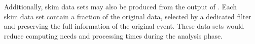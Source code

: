 Additionally, skim data sets may also be produced from the output of \passtwo. Each skim data set contain a fraction of the original data, selected by a dedicated filter and preserving the full information of the original event. These data sets would reduce computing needs and processing times during the analysis phase.   

